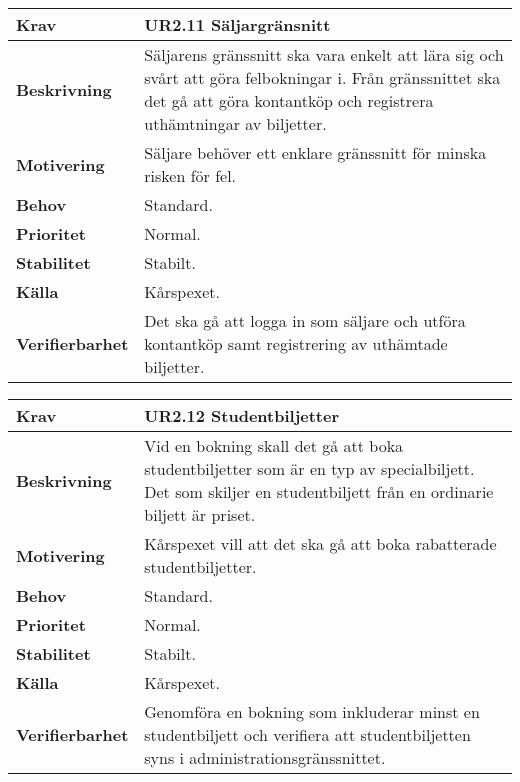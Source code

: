 \documentclass[a4paper, twoside, 11pt, titlepage]{article}
\begin{document}
		\begin{tabular} { p{2.6cm} p{12.5cm} }
			\hline
			\sffamily\textbf{Krav} & \sffamily\textbf{UR2.11 Säljargränsnitt  } \\
			\hline
			\sffamily\textbf{Beskrivning} & Säljarens gränssnitt ska vara enkelt att lära sig och svårt att göra felbokningar i. Från gränssnittet ska det gå att göra kontantköp och registrera uthämtningar av biljetter.  \\
			\hline
			\sffamily\textbf{Motivering} & Säljare behöver ett enklare gränssnitt för minska risken för fel.  \\
			\hline
			\sffamily\textbf{Behov} & Standard.  \\
			\hline
			\sffamily\textbf{Prioritet} & Normal.  \\
			\hline
			\sffamily\textbf{Stabilitet} & Stabilt.  \\
			\hline
			\sffamily\textbf{Källa} & Kårspexet.  \\
			\hline
			\sffamily\textbf{Verifierbarhet} & Det ska gå att logga in som säljare och utföra kontantköp samt registrering av uthämtade biljetter.  \\
			\hline
		\end{tabular}
		\vspace{6mm}

		\begin{tabular} { p{2.6cm} p{12.5cm} }
			\hline
			\sffamily\textbf{Krav} & \sffamily\textbf{UR2.12 Studentbiljetter  } \\
			\hline
			\sffamily\textbf{Beskrivning} & Vid en bokning skall det gå att boka studentbiljetter som är en typ av specialbiljett. Det som skiljer en studentbiljett från en ordinarie biljett är priset.  \\
			\hline
			\sffamily\textbf{Motivering} & Kårspexet vill att det ska gå att boka rabatterade studentbiljetter.  \\
			\hline
			\sffamily\textbf{Behov} & Standard.  \\
			\hline
			\sffamily\textbf{Prioritet} & Normal.  \\
			\hline
			\sffamily\textbf{Stabilitet} & Stabilt.  \\
			\hline
			\sffamily\textbf{Källa} & Kårspexet.  \\
			\hline
			\sffamily\textbf{Verifierbarhet} & Genomföra en bokning som inkluderar minst en studentbiljett och verifiera att studentbiljetten syns i administrationsgränssnittet.  \\
			\hline
		\end{tabular}
		\vspace{6mm}
\end{document}
